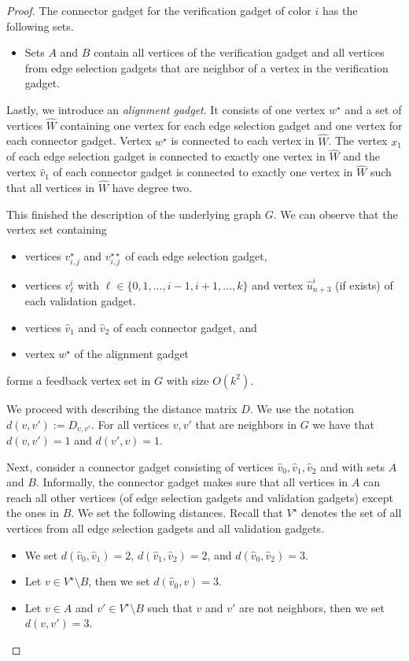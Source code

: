 \documentclass[11pt,a4paper]{article}
\theoremstyle{remark}
\theoremstyle{definition}
\begin{document}
\begin{proof}
    The connector gadget for the verification gadget of color $i$ has the following sets.
    \begin{itemize}
        \item Sets $A$ and $B$ contain all vertices of the verification gadget and all vertices from edge selection gadgets that are neighbor of a vertex in the verification gadget.
    \end{itemize}

Lastly, we introduce an \emph{alignment gadget}. It consists of one vertex $w^\star$ and a set of vertices $\hat{W}$ containing one vertex for each edge selection gadget and one vertex for each connector gadget. Vertex $w^\star$ is connected to each vertex in $\hat{W}$.
The vertex $x_1$ of each edge selection gadget is connected to exactly one vertex in $\hat{W}$ and the vertex $\hat{v}_1$ of each connector gadget is connected to exactly one vertex in $\hat{W}$ such that all vertices in $\hat{W}$ have degree two.

This finished the description of the underlying graph $G$. We can observe that the vertex set containing
\begin{itemize}
    \item vertices $v_{i,j}^\star$ and $v_{i,j}^{\star\star}$ of each edge selection gadget,
    \item vertices $v^i_\ell$ with $\ell\in\{0,1,\ldots,i-1,i+1,\ldots,k\}$ and vertex $\hat{u}^i_{n+3}$ (if exists) of each validation gadget.
    \item vertices $\hat{v}_1$ and $\hat{v}_2$ of each connector gadget, and
    \item vertex $w^\star$ of the alignment gadget
\end{itemize}
forms a feedback vertex set in $G$ with size $O(k^2)$.

We proceed with describing the distance matrix $D$. We use the notation $d(v,v'):= D_{v,v'}$. For all vertices $v,v'$ that are neighbors in $G$ we have that $d(v,v')=1$ and $d(v',v)=1$.

Next, consider a connector gadget consisting of vertices $\hat{v}_0,\hat{v}_1,\hat{v}_2$ and with sets $A$ and $B$. Informally, the connector gadget makes sure that all vertices in $A$ can reach all other vertices (of edge selection gadgets and validation gadgets) except the ones in $B$. We set the following distances. Recall that $V^\star$ denotes the set of all vertices from all edge selection gadgets and all validation gadgets.
\begin{itemize}
    \item We set $d(\hat{v}_0,\hat{v}_1)=2$, $d(\hat{v}_1,\hat{v}_2)=2$, and $d(\hat{v}_0,\hat{v}_2)=3$.
    \item Let $v\in V^\star\setminus B$, then we set $d(\hat{v}_0,v)=3$.
    \item Let $v\in A$ and $v'\in V^\star\setminus B$ such that $v$ and $v'$ are not neighbors, then we set $d(v,v')=3$.
\end{itemize}


\end{proof}
\end{document}
